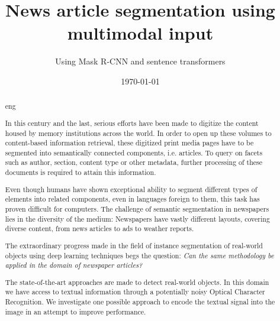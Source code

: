 \documentclass[oneside, english, bibtex]{kththesis}
\title{News article segmentation using multimodal input}
\subtitle{Using Mask R-CNN and sentence transformers}
\date{\today}
\begin{document}
%

\titlepage
\bookinfopage

\frontmatter
\setcounter{page}{1}
\begin{abstract}
  \markboth{\abstractname}{}
\begin{scontents}[store-env=lang]
eng
\end{scontents}
\begin{scontents}[store-env=abstracts,print-env=true]

In this century and the last, serious efforts have been made to digitize the content housed by memory institutions across the world. In order to open up these volumes to content-based information retrieval, these digitized print media pages have to be segmented into semantically connected components, i.e. articles. To query on facets such as author, section, content type or other metadata, further processing of these documents is required to attain this information.

Even though humans have shown exceptional ability to segment different types of elements into related components, even in languages foreign to them, this task has proven difficult for computers. The challenge of semantic segmentation in newspapers lies in the diversity of the medium: Newspapers have vastly different layouts, covering diverse content, from news articles to ads to weather reports.

The extraordinary progress made in the field of instance segmentation of real-world objects using deep learning techniques begs the question: \textit{Can the same methodology be applied in the domain of newspaper articles?}

The state-of-the-art approaches are made to detect real-world objects. In this domain we have access to textual information through a potentially noisy Optical Character Recognition. We investigate one possible approach to encode the textual signal into the image in an attempt to improve performance.


\end{scontents}
\end{abstract}
\end{document}
